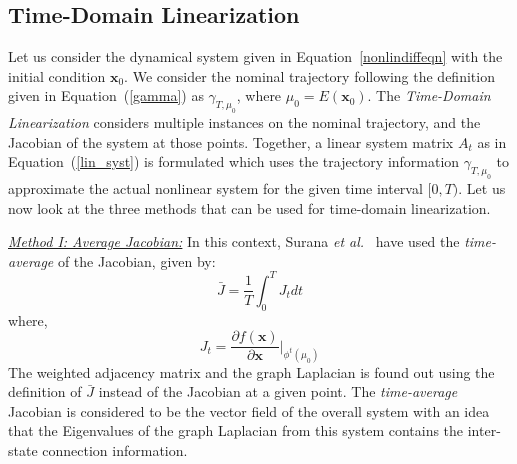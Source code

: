 \subsection{Time-Domain Linearization}
\label{timedomain}

Let us consider the dynamical system given in Equation~\ref{nonlindiffeqn} with the initial condition $\textbf{x}_0$. We consider the nominal trajectory following the definition given in Equation~(\ref{gamma}) as $\gamma_{T,\mu_0}$, where $\mu_0 = E(\textbf{x}_0)$. The \textit{Time-Domain Linearization} considers multiple instances on the nominal trajectory, and the Jacobian of the system at those points. Together, a linear system matrix $A_{t}$ as in Equation~(\ref{lin_syst}) is formulated which uses the trajectory information $\gamma_{T,\mu_0}$ to approximate the actual nonlinear system for the given time interval $[0,T)$. Let us now look at the three methods that can be used for time-domain linearization. 

\underline{\textit{Method I: Average Jacobian:}} In this context, Surana \textit{et al.}~\cite{surana2012iterative} have used the \textit{time-average} of the Jacobian, given by:
\begin{equation}
\bar{J} = \frac{1}{T} \int_{0}^{T} J_t dt
\end{equation}
\noindent where,
\begin{equation}
J_t = \displaystyle \frac{\partial f(\mathbf{x})}{\partial \mathbf{x}} \bigg|_{\phi^t(\mu_0)}
\end{equation}
The weighted adjacency matrix and the graph Laplacian is found out using the definition of $\bar{J}$ instead of the Jacobian at a given point. The \textit{time-average} Jacobian is considered to be the vector field of the overall system with an idea that the Eigenvalues of the graph Laplacian from this system contains the inter-state connection information. 

